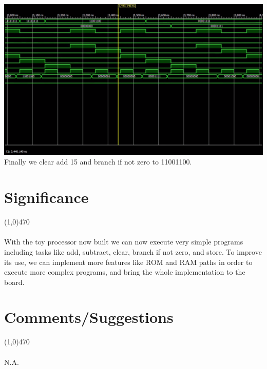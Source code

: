 \documentclass[12pt]{article}
\begin{document}
\begin{center}
	\includegraphics[scale=.35]{c4.png}\\
	Finally we clear add 15 and branch if not zero to 11001100.
\end{center}

	\newpage
\section{Significance} \vspace{-.7cm} \line(1,0){470}
	\paragraph{} 
		With the toy processor now built we can now execute very simple programs including tasks like add, subtract, clear, branch if not zero, and store. To improve its use, we can implement more features like ROM and RAM paths in order to execute more complex programs, and bring the whole implementation to the board. 

 \section{Comments/Suggestions}\vspace{-.7cm} \line(1,0){470}
 	\paragraph{} 
 		N.A.
		
\end{document}
